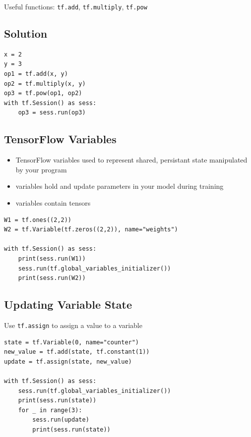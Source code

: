 \documentclass[11pt]{article}
\begin{document}
Useful functions: \texttt{tf.add}, \texttt{tf.multiply}, \texttt{tf.pow}

\subsection*{Solution}
\label{sec:org55c325d}

\begin{verbatim}
x = 2
y = 3
op1 = tf.add(x, y)
op2 = tf.multiply(x, y)
op3 = tf.pow(op1, op2)
with tf.Session() as sess:
    op3 = sess.run(op3)
\end{verbatim}

\subsection*{TensorFlow Variables}
\label{sec:orge4f5913}

\begin{itemize}
\item TensorFlow variables used to represent shared, persistant state manipulated by your program
\item variables hold and update parameters in your model during training
\item variables contain tensors
\end{itemize}

\begin{verbatim}
W1 = tf.ones((2,2))
W2 = tf.Variable(tf.zeros((2,2)), name="weights")

with tf.Session() as sess:
    print(sess.run(W1))
    sess.run(tf.global_variables_initializer())
    print(sess.run(W2))
\end{verbatim}

\subsection*{Updating Variable State}
\label{sec:org4fbe671}

Use \texttt{tf.assign} to assign a value to a variable

\begin{verbatim}
state = tf.Variable(0, name="counter")
new_value = tf.add(state, tf.constant(1))
update = tf.assign(state, new_value)

with tf.Session() as sess:
    sess.run(tf.global_variables_initializer())
    print(sess.run(state))
    for _ in range(3):
        sess.run(update)
        print(sess.run(state))
\end{verbatim}
\end{document}
